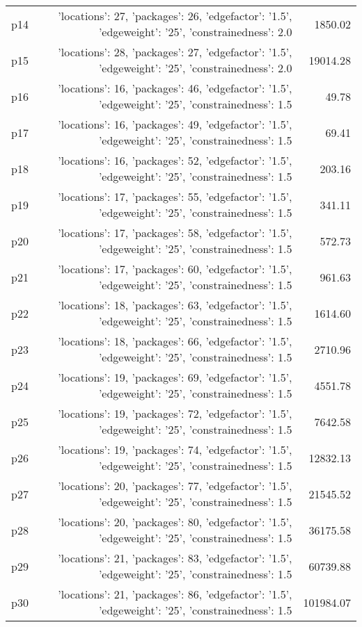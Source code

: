 \documentclass{article}
\begin{document}
\begin{center}
\begin{tabular}{@{}l|r|r@{}}
  p14&{'locations': 27, 'packages': 26, 'edgefactor': '1.5', 'edgeweight': '25', 'constrainedness': 2.0}&1850.02\\
  p15&{'locations': 28, 'packages': 27, 'edgefactor': '1.5', 'edgeweight': '25', 'constrainedness': 2.0}&19014.28\\
  p16&{'locations': 16, 'packages': 46, 'edgefactor': '1.5', 'edgeweight': '25', 'constrainedness': 1.5}&49.78\\
  p17&{'locations': 16, 'packages': 49, 'edgefactor': '1.5', 'edgeweight': '25', 'constrainedness': 1.5}&69.41\\
  p18&{'locations': 16, 'packages': 52, 'edgefactor': '1.5', 'edgeweight': '25', 'constrainedness': 1.5}&203.16\\
  p19&{'locations': 17, 'packages': 55, 'edgefactor': '1.5', 'edgeweight': '25', 'constrainedness': 1.5}&341.11\\
  p20&{'locations': 17, 'packages': 58, 'edgefactor': '1.5', 'edgeweight': '25', 'constrainedness': 1.5}&572.73\\
  p21&{'locations': 17, 'packages': 60, 'edgefactor': '1.5', 'edgeweight': '25', 'constrainedness': 1.5}&961.63\\
  p22&{'locations': 18, 'packages': 63, 'edgefactor': '1.5', 'edgeweight': '25', 'constrainedness': 1.5}&1614.60\\
  p23&{'locations': 18, 'packages': 66, 'edgefactor': '1.5', 'edgeweight': '25', 'constrainedness': 1.5}&2710.96\\
  p24&{'locations': 19, 'packages': 69, 'edgefactor': '1.5', 'edgeweight': '25', 'constrainedness': 1.5}&4551.78\\
  p25&{'locations': 19, 'packages': 72, 'edgefactor': '1.5', 'edgeweight': '25', 'constrainedness': 1.5}&7642.58\\
  p26&{'locations': 19, 'packages': 74, 'edgefactor': '1.5', 'edgeweight': '25', 'constrainedness': 1.5}&12832.13\\
  p27&{'locations': 20, 'packages': 77, 'edgefactor': '1.5', 'edgeweight': '25', 'constrainedness': 1.5}&21545.52\\
  p28&{'locations': 20, 'packages': 80, 'edgefactor': '1.5', 'edgeweight': '25', 'constrainedness': 1.5}&36175.58\\
  p29&{'locations': 21, 'packages': 83, 'edgefactor': '1.5', 'edgeweight': '25', 'constrainedness': 1.5}&60739.88\\
  p30&{'locations': 21, 'packages': 86, 'edgefactor': '1.5', 'edgeweight': '25', 'constrainedness': 1.5}&101984.07
                            \end{tabular}
                            \end{center}
                    
\end{document}
